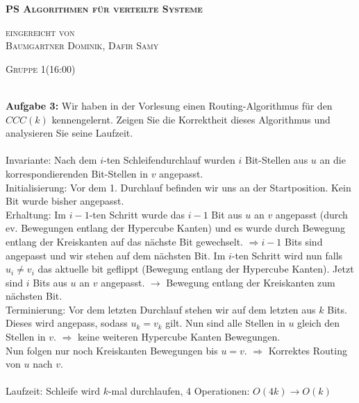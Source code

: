 \documentclass[12pt,a4paper]{report}
\begin{document}
\begin{titlepage}
	\begin{center}
		
		\vspace*{1.0cm}
		\huge
		\textsc{\bf{PS Algorithmen für verteilte Systeme}}
		
		\vspace*{4.0cm}
		\textsc{
			\normalsize{eingereicht von} \\[0.5\baselineskip]
			{\large Baumgartner Dominik, Dafir Samy}
		}
		
		\vspace*{3.0cm}
		\textsc{
			\normalsize{Gruppe  1(16:00)}
		}
		
	\end{center}
	
\end{titlepage}
\ \\
\textbf{Aufgabe 3:}
Wir haben in der Vorlesung einen Routing-Algorithmus für den
$CCC(k)$ kennengelernt. Zeigen Sie die Korrektheit dieses Algorithmus und
analysieren Sie seine Laufzeit.\\
\\
Invariante: Nach dem $i$-ten Schleifendurchlauf wurden $i$ Bit-Stellen aus $u$ an die korrespondierenden Bit-Stellen in $v$ angepasst.\\
Initialisierung: Vor dem 1. Durchlauf befinden wir uns an der Startposition. Kein Bit wurde bisher angepasst.\\
Erhaltung: Im $i-1$-ten Schritt wurde das $i-1$ Bit aus $u$ an $v$ angepasst (durch ev. Bewegungen entlang der Hypercube Kanten) und es wurde durch Bewegung entlang der Kreiskanten auf das nächste Bit gewechselt. $\Rightarrow i-1$ Bits sind angepasst und wir stehen auf dem nächsten Bit. Im $i$-ten Schritt wird nun falls $u_i \ne v_i$ das aktuelle bit geflippt (Bewegung entlang der Hypercube Kanten). Jetzt sind $i$ Bits aus $u$ an $v$ angepasst. $\rightarrow$ Bewegung entlang der Kreiskanten zum nächsten Bit.\\
Terminierung: Vor dem letzten Durchlauf stehen wir auf dem letzten aus $k$ Bits. Dieses wird angepass, sodass $u_k = v_k$ gilt. Nun sind alle Stellen in $u$ gleich den Stellen in $v$. $\Rightarrow$ keine weiteren Hypercube Kanten Bewegungen.\\
Nun folgen nur noch Kreiskanten Bewegungen bis $u=v$. $\Rightarrow$ Korrektes Routing von $u$ nach $v$.\\
\\
Laufzeit: Schleife wird $k$-mal durchlaufen, 4 Operationen: $O(4k) \rightarrow O(k)$\\
\end{document}
